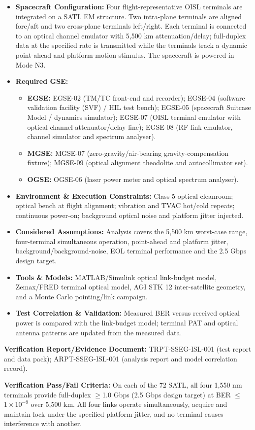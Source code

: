 \begin{itemize}
\item \textbf{Spacecraft Configuration:} Four flight-representative OISL terminals are integrated on a SATL EM structure. Two intra-plane terminals are aligned fore/aft and two cross-plane terminals left/right. Each terminal is connected to an optical channel emulator with 5,500 km attenuation/delay; full-duplex data at the specified rate is transmitted while the terminals track a dynamic point-ahead and platform-motion stimulus. The spacecraft is powered in Mode N3.
\item \textbf{Required GSE:}
\begin{itemize}
\item \textbf{EGSE:} EGSE-02 (TM/TC front-end and recorder); EGSE-04 (software validation facility (SVF) / HIL test bench); EGSE-05 (spacecraft Suitcase Model / dynamics simulator); EGSE-07 (OISL terminal emulator with optical channel attenuator/delay line); EGSE-08 (RF link emulator, channel simulator and spectrum analyser).
\item \textbf{MGSE:} MGSE-07 (zero-gravity/air-bearing gravity-compensation fixture); MGSE-09 (optical alignment theodolite and autocollimator set).
\item \textbf{OGSE:} OGSE-06 (laser power meter and optical spectrum analyser).
\end{itemize}
\item \textbf{Environment \& Execution Constraints:} Class 5 optical cleanroom; optical bench at flight alignment; vibration and TVAC hot/cold repeats; continuous power-on; background optical noise and platform jitter injected.
\item \textbf{Considered Assumptions:} Analysis covers the 5,500 km worst-case range, four-terminal simultaneous operation, point-ahead and platform jitter, background/background-noise, EOL terminal performance and the 2.5 Gbps design target.
\item \textbf{Tools \& Models:} MATLAB/Simulink optical link-budget model, Zemax/FRED terminal optical model, AGI STK 12 inter-satellite geometry, and a Monte Carlo pointing/link campaign.
\item \textbf{Test Correlation \& Validation:} Measured BER versus received optical power is compared with the link-budget model; terminal PAT and optical antenna patterns are updated from the measured data.
\end{itemize}
\par\textbf{Verification Report/Evidence Document:} TRPT-SSEG-ISL-001 (test report and data pack); ARPT-SSEG-ISL-001 (analysis report and model correlation record).
\par\textbf{Verification Pass/Fail Criteria:} On each of the 72 SATL, all four 1,550 nm terminals provide full-duplex $\ge$1.0 Gbps (2.5 Gbps design target) at BER $\le$$1\times10^{-9}$ over 5,500 km. All four links operate simultaneously, acquire and maintain lock under the specified platform jitter, and no terminal causes interference with another.
\par\medskip
